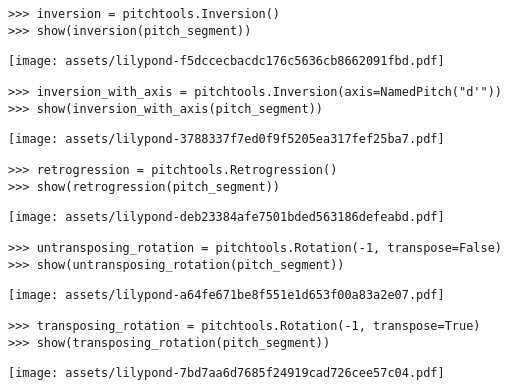 \begin{abjadbookoutput}
\begin{singlespacing}
\vspace{-0.5\baselineskip}
\begin{lstlisting}
>>> inversion = pitchtools.Inversion()
>>> show(inversion(pitch_segment))
\end{lstlisting}
\noindent\texttt{[image: assets/lilypond-f5dccecbacdc176c5636cb8662091fbd.pdf]}
\begin{lstlisting}
>>> inversion_with_axis = pitchtools.Inversion(axis=NamedPitch("d'"))
>>> show(inversion_with_axis(pitch_segment))
\end{lstlisting}
\noindent\texttt{[image: assets/lilypond-3788337f7ed0f9f5205ea317fef25ba7.pdf]}
\end{singlespacing}
\end{abjadbookoutput}

\begin{comment}
<abjad>
retrogression = pitchtools.Retrogression()
show(retrogression(pitch_segment))
</abjad>
\end{comment}

\begin{abjadbookoutput}
\begin{singlespacing}
\vspace{-0.5\baselineskip}
\begin{lstlisting}
>>> retrogression = pitchtools.Retrogression()
>>> show(retrogression(pitch_segment))
\end{lstlisting}
\noindent\texttt{[image: assets/lilypond-deb23384afe7501bded563186defeabd.pdf]}
\end{singlespacing}
\end{abjadbookoutput}

\begin{comment}
<abjad>
untransposing_rotation = pitchtools.Rotation(-1, transpose=False)
show(untransposing_rotation(pitch_segment))
transposing_rotation = pitchtools.Rotation(-1, transpose=True)
show(transposing_rotation(pitch_segment))
</abjad>
\end{comment}

\begin{abjadbookoutput}
\begin{singlespacing}
\vspace{-0.5\baselineskip}
\begin{lstlisting}
>>> untransposing_rotation = pitchtools.Rotation(-1, transpose=False)
>>> show(untransposing_rotation(pitch_segment))
\end{lstlisting}
\noindent\texttt{[image: assets/lilypond-a64fe671be8f551e1d653f00a83a2e07.pdf]}
\begin{lstlisting}
>>> transposing_rotation = pitchtools.Rotation(-1, transpose=True)
>>> show(transposing_rotation(pitch_segment))
\end{lstlisting}
\noindent\texttt{[image: assets/lilypond-7bd7aa6d7685f24919cad726cee57c04.pdf]}
\end{singlespacing}
\end{abjadbookoutput}

